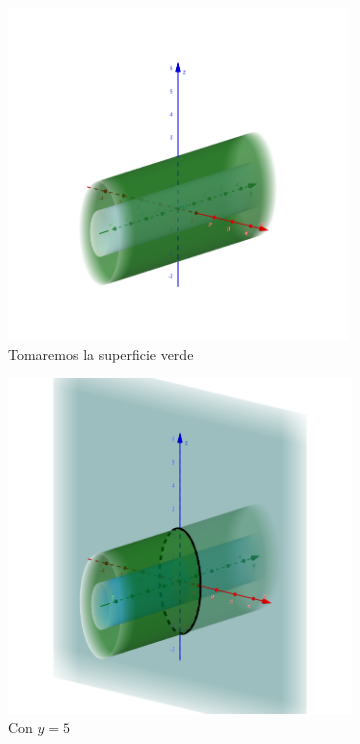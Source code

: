 \documentclass[letterpaper,11pt]{article}
\begin{document}
\begin{enumerate}
\begin{figure}[h!]
\begin{subfigure}{.7\textwidth}
		\includegraphics[width=9cm]{img/2d1}
		\caption{Tomaremos la superficie verde }
		\label{F1_1}
	\end{subfigure}
	\begin{subfigure}{0.3\textwidth}
		\includegraphics[width=\linewidth]{img/2d1_1}
		\caption{Con $ y = 5 $}
	\end{subfigure}
	\begin{subfigure}{0.3\textwidth}

\end{subfigure}
\end{figure}
\end{enumerate}
\end{document}
